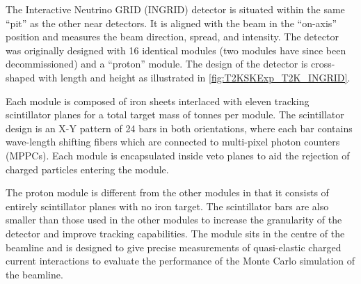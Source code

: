 The Interactive Neutrino GRID (INGRID) detector is situated within the same ``pit'' as the other near detectors. It is aligned with the beam in the ``on-axis'' position and measures the beam direction, spread, and intensity. The detector was originally designed with 16 identical modules \cite{t2k_det} (two modules have since been decommissioned) and a ``proton'' module. The design of the detector is cross-shaped with length and height  as illustrated in \autoref{fig:T2KSKExp_T2K_INGRID}.

Each module is composed of iron sheets interlaced with eleven tracking scintillator planes for a total target mass of  tonnes per module. The scintillator design is an X-Y pattern of 24 bars in both orientations, where each bar contains wave-length shifting fibers which are connected to multi-pixel photon counters (MPPCs). Each module is encapsulated inside veto planes to aid the rejection of charged particles entering the module.

The proton module is different from the other modules in that it consists of entirely scintillator planes with no iron target. The scintillator bars are also smaller than those used in the other modules to increase the granularity of the detector and improve tracking capabilities. The module sits in the centre of the beamline and is designed to give precise measurements of quasi-elastic charged current interactions to evaluate the performance of the Monte Carlo simulation of the beamline. 

